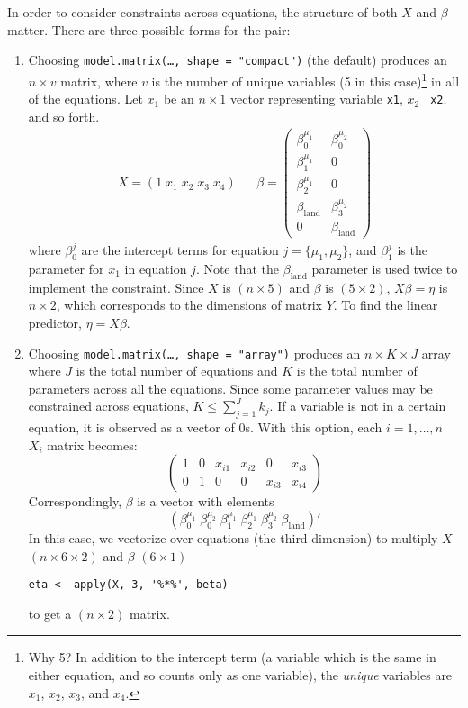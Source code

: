 \documentclass[oneside,letterpaper,12pt]{article}
\begin{document}
In order to consider constraints across equations, the structure of
both $X$ and $\beta$ matter.  There are three possible forms for the
pair:  
\begin{enumerate}

\item  Choosing {\tt model.matrix(\dots, shape = "compact")} (the
default) produces an $n \times v$ matrix, where $v$ is the number of
unique variables (5 in this case)\footnote{Why 5? In addition to the
intercept term (a variable which is the same in either equation, and
so counts only as one variable), the \emph{unique} variables are
$x_1$, $x_2$, $x_3$, and $x_4$.} in all of the equations.  Let $x_1$
be an $n \times 1$ vector representing variable {\tt x1}, $x_2$ {\tt
x2}, and so forth.
\begin{eqnarray*}
X = (1 \; x_1 \; x_2 \; x_3 \; x_4) & & \beta = \left(
\begin{array}{cc}
\beta_0^{\mu_1}       & \beta_0^{\mu_2} \\
\beta_1^{\mu_1}       & 0 \\
\beta_2^{\mu_1}       & 0 \\
\beta_{\textrm{land}} & \beta_3^{\mu_2} \\
0                     & \beta_{\textrm{land}}
\end{array} \right) 
\end{eqnarray*}
where $\beta_0^j$ are the intercept terms for equation $j = \{\mu_1,
\mu_2\}$, and $\beta_1^j$ is the parameter for $x_1$ in equation $j$.
Note that the $\beta_{\textrm{land}}$ parameter is used twice to
implement the constraint.  Since $X$ is $(n \times 5)$ and $\beta$ is
$(5 \times 2)$, $X\beta = \eta$ is $n \times 2$, which corresponds to
the dimensions of matrix $Y$.  To find the linear predictor, $\eta = X
\beta$.  

\item Choosing {\tt model.matrix(\dots, shape = "array")} produces an $n \times K
\times J$ array where $J$ is the total number of equations and $K$
is the total number of parameters across all the equations.  Since
some parameter values may be constrained across equations, $K \leq
\sum_{j=1}^J k_j$.  If a variable is not in a certain equation, it is
observed as a vector of 0s.  With this option, each $i = 1, \dots, n$
$X_i$ matrix becomes:
\begin{equation*}
\left( \begin{array}{ccccccc}
1 & 0 & x_{i1} & x_{i2} & 0      & x_{i3} \\
0 & 1 & 0      & 0      & x_{i3} & x_{i4}
\end{array} \right) 
\end{equation*}
Correspondingly, $\beta$ is a vector with elements
\begin{equation*}
(\beta_0^{\mu_1} \; \beta_0^{\mu_2} \; \beta_1^{\mu_1} \;
\beta_2^{\mu_1} \; \beta_3^{\mu_2} \; \beta_{\textrm{land}})'
\end{equation*}
In this case, we vectorize over equations (the third dimension) to
multiply $X$ $(n \times 6 \times 2)$ and $\beta$ $(6 \times 1)$ 
\begin{verbatim}  
eta <- apply(X, 3, '%*%', beta)
\end{verbatim}  
to get a $(n \times 2)$ matrix.  


\end{enumerate}
\end{document}
